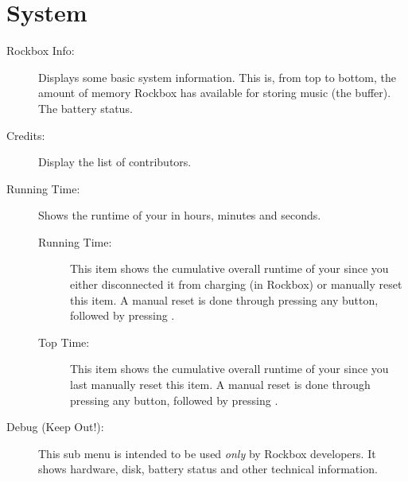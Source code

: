 \section{\label{ref:Info}System}

\begin{description}
\item[Rockbox Info:]
  Displays some basic system information. This is, from top to bottom,
  the amount of memory Rockbox has available for storing music (the buffer).
  The battery status.
%

\item[Credits:]
  Display the list of contributors.

\item[Running Time:]
  Shows the runtime of your \dap{} in hours, minutes and seconds.
  \begin{description}
    \item[Running Time:]
        This item shows the cumulative overall runtime of your \dap{} since you 
        either disconnected it from charging (in Rockbox) or manually 
        reset this item. A manual reset is done through pressing any button, 
        followed by pressing \ActionStdOk{}.
    \item[Top Time:]
        This item shows the cumulative overall runtime of your \dap{} since you 
        last manually reset this item. A manual reset is done through pressing 
        any button, followed by pressing \ActionStdOk{}.
  \end{description}

\item[Debug (Keep Out!):]
  This sub menu is intended to be used \emph{only} by Rockbox developers.
  It shows hardware, disk, battery status and other technical information.  
\end{description}

